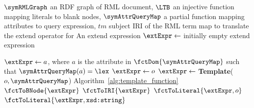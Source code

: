 \begin{algorithm}[htbp]
	\caption{ExtractExtendExpr: Extend expression translation from an RML term map}
	\label{alg:rml_termmap_extend_expr}
	\begin{algorithmic}[1]
		\Require 
            $\symRMLGraph$ an RDF graph of RML document,
            \Statex \qquad $\LTB$ an injective function mapping literals to blank nodes, 
            \Statex \qquad $\symAttrQueryMap$ a partial function mapping attributes to query expression,
            \Statex \qquad $tm$ subject IRI of the RML term map to translate the extend operator for
		\Ensure An extend expression
        \State $\extExpr \gets $ initially empty extend expression

    		\State $\extExpr \gets a$, where $a$ is the attribute in $\fctDom{\symAttrQueryMap}$ such that $\symAttrQueryMap(a) = \lex$
    		\State $\extExpr \gets o$
            \State  $\extExpr \gets $ \textbf{Template}($o, \symAttrQueryMap$)  \Comment Algorithm~\ref{alg:template_function}
		\EndIf
\medskip
            \State \Return $\fctToBNode{\extExpr}$
            \State \Return $\fctToIRI{\extExpr}$
            \State \Return $\fctToLiteral{\extExpr, o}$
        \Else 
            \State \Return $\fctToLiteral{\extExpr, \texttt{xsd:string}}$
		\EndIf
	\end{algorithmic}
\end{algorithm}


